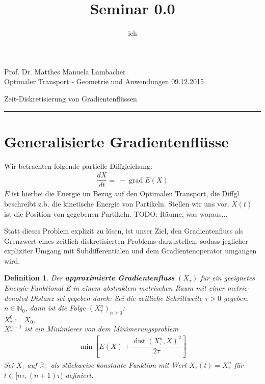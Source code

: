 \documentclass[11pt,a4paper,notitlepage]{scrreprt}
\author{ich}
\title{Seminar 0.0}
\newcommand{\RR}{\mathbb{R}}
\newcommand{\NN}{\mathbb{N}}
\newcommand{\dist}{\operatorname{dist}}
\newcommand{\grad}{\operatorname{grad}}
\newtheorem{defi}{Definition}[section]
\begin{document}
\parindent 0pt



\pagestyle{plain}



 Prof. Dr. Matthes \hfill Manuela Lambacher\\
 Optimaler Transport - Geometrie und Anwendungen \hfill 09.12.2015
 \begin{center}
  {\huge{Zeit-Diskretisierung von Gradientenflüssen}} 
 \end{center}
 
 \hrule
 
\renewcommand{\thechapter}{\arabic{section}}
\renewcommand{\thesection}{\arabic{section}}
\section{Generalisierte Gradientenflüsse}

Wir betrachten folgende partielle Diffgleichung: 
\begin{eqnarray}
\dfrac{dX}{dt}=~-\grad E(X) \label{eq1}
\end{eqnarray}
$E$ ist hierbei die Energie im Bezug auf den Optimalen Transport, die Diffgl beschreibt z.b. die kinetische Energie von Partikeln. 
Stellen wir uns vor, $X(t)$ ist die Position von gegebenen Partikeln.
TODO: Räume, was woraus... 
\newline

Statt dieses Problem explizit zu lösen, ist unser Ziel, den Gradientenfluss als Grenzwert eines zeitlich diskretisierten Problems darzustellen, sodass jeglicher expliziter Umgang mit Subdifferentialen und dem Gradientenoperator umgangen wird.

\begin{defi}\label{approx}
Der \textbf{approximierte Gradientenfluss} $(X_\tau)$ für ein geeignetes Energie-Funktional E in einem abstraktem metrischen Raum mit einer metric-denoted Distanz sei gegeben durch:
\newline
Sei die zeitliche Schrittweite $\tau > 0$ gegeben, $n\in\NN_0$, dann ist die Folge $\left( X^n_\tau \right)_{n\geq 0}$:
\\
$X_\tau^0:=X_0,$
\\
$X_\tau^{n+1}$ ist ein Minimierer von dem Minimerungsproblem
\begin{eqnarray}
\min\left[E(X)+\dfrac{\dist(X_\tau^n,X)^2}{2\tau}\right] \label{Min}
\end{eqnarray}
Sei $X_\tau$ auf $\RR_+$ als stückweise konstante Funktion mit Wert $X_\tau(t)=X^n_\tau$ für $t\in [n\tau,(n+1)\tau)$ definiert.
\end{defi}
\end{document}
